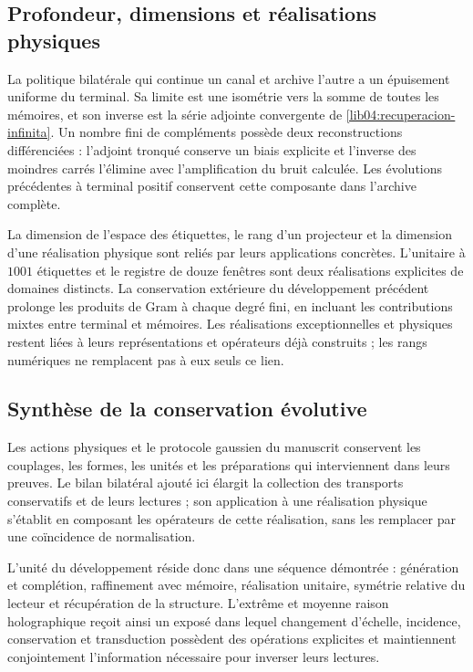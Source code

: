 \subsection{Profondeur, dimensions et réalisations physiques}
\label{lib06:profundidad}

La politique bilatérale qui continue un canal et archive l’autre
a un épuisement uniforme du terminal. Sa limite est une
isométrie vers la somme de toutes les mémoires, et son inverse est
la série adjointe convergente de
\eqref{lib04:recuperacion-infinita}. Un nombre fini de
compléments possède deux reconstructions différenciées :
l’adjoint tronqué conserve un biais explicite et l’inverse des
moindres carrés l’élimine avec l’amplification du bruit
calculée. Les évolutions précédentes à terminal positif
conservent cette composante dans l’archive complète.

La dimension de l’espace des étiquettes, le rang d’un projecteur et
la dimension d’une réalisation physique sont reliés par
leurs applications concrètes. L’unitaire à \(1001\) étiquettes et le
registre de douze fenêtres sont deux réalisations explicites de
domaines distincts. La conservation extérieure du développement
précédent prolonge les produits de Gram à chaque degré fini,
en incluant les contributions mixtes entre terminal et mémoires.
Les réalisations exceptionnelles et physiques restent liées
à leurs représentations et opérateurs déjà construits ; les rangs
numériques ne remplacent pas à eux seuls ce lien.

\subsection{Synthèse de la conservation évolutive}
Les actions physiques et le protocole gaussien du manuscrit
conservent les couplages, les formes, les unités et les
préparations qui interviennent dans leurs preuves. Le bilan
bilatéral ajouté ici élargit la collection des transports
conservatifs et de leurs lectures ; son application à une réalisation
physique s’établit en composant les opérateurs de cette
réalisation, sans les remplacer par une coïncidence de
normalisation.

L'unité du développement réside donc dans une séquence démontrée : génération et complétion, raffinement avec mémoire, réalisation unitaire, symétrie relative du lecteur et récupération de la structure. L'extrême et moyenne raison holographique reçoit ainsi un exposé dans lequel changement d'échelle, incidence, conservation et transduction possèdent des opérations explicites et maintiennent conjointement l'information nécessaire pour inverser leurs lectures.

